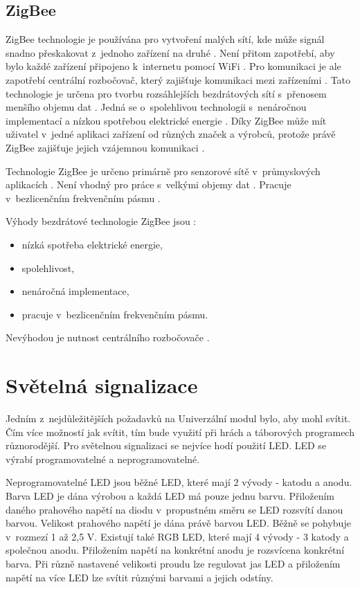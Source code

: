 \subsection{ZigBee}
ZigBee technologie je používána pro vytvoření malých sítí, kde může signál snadno přeskakovat z~jednoho zařízení na druhé \cite{ZigBee_smart}.
Není přitom zapotřebí, aby bylo každé zařízení připojeno k~internetu pomocí WiFi \cite{ZigBee_smart}. Pro komunikaci je ale zapotřebí centrální 
rozbočovač, který zajišťuje komunikaci mezi zařízeními \cite{ZigBee_smart}. Tato technologie je určena pro tvorbu rozsáhlejších bezdrátových sítí
s~přenosem menšího objemu dat \cite{ZigBee_smart}. Jedná se o~spolehlivou technologii s~nenáročnou implementací a nízkou spotřebou elektrické energie 
\cite{ZigBee_smart}. Díky ZigBee může mít uživatel v~jedné aplikaci zařízení 
od různých značek a výrobců, protože právě ZigBee zajišťuje jejich vzájemnou komunikaci \cite{ZigBee_smart}.

Technologie ZigBee je určeno primárně pro senzorové sítě v~průmyslových aplikacích \cite{Bezdrat_muni}. Není vhodný pro práce s~velkými objemy dat \cite{Bezdrat_muni}.
Pracuje v~bezlicenčním frekvenčním pásmu \cite{Bezdrat_muni}.

Výhody bezdrátové technologie ZigBee jsou \cite{ZigBee_smart}:
\begin{itemize}
  \item nízká spotřeba elektrické energie,
  \item spolehlivost, 
  \item nenáročná implementace,
  \item pracuje v~bezlicenčním frekvenčním pásmu. 
\end{itemize}

Nevýhodou je nutnost centrálního rozbočovače \cite{ZigBee_smart}.

\section{Světelná signalizace}
Jedním z~nejdůležitějších požadavků na Univerzální modul bylo, aby mohl svítit. Čím více možností jak svítit, tím bude využití při hrách a táborových 
programech různorodější. Pro světelnou signalizaci se nejvíce hodí použití LED. LED se výrabí programovatelné a neprogramovatelné. 

Neprogramovatelné LED jsou běžné LED, které mají 2 vývody - katodu a anodu. Barva LED je dána výrobou a každá LED má pouze jednu 
barvu. Přiložením daného prahového napětí na diodu v~propustném směru se LED rozsvítí danou barvou. Velikost prahového napětí je dána
právě barvou LED. Běžně se pohybuje v~rozmezí 1 až 2,5 V. Existují také RGB LED, které mají 4 vývody - 3 katody a společnou anodu. 
Přiložením napětí na konkrétní anodu je rozsvícena konkrétní barva. Při různě nastavené velikosti proudu lze regulovat jas LED 
a přiložením napětí na více LED lze svítit různými barvami a jejich odstíny. 

